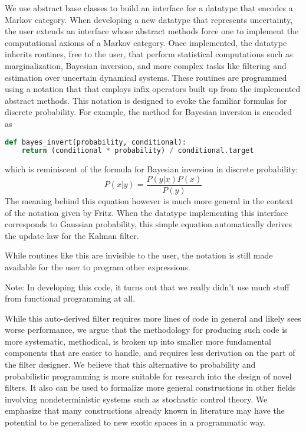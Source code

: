 We use abstract base classes to build an interface for a datatype that encodes a Markov category.
When developing a new datatype that represents uncertainty, the user extends an interface whose abstract methods force one to implement the computational axioms of a Markov category.
Once implemented, the datatype inherits routines, free to the user, that perform statistical computations such as marginalization, Bayesian inversion, and more complex tasks like filtering and estimation over uncertain dynamical systems.
These routines are programmed using a notation that that employs infix operators built up from the implemented abstract methods.
This notation is designed to evoke the familiar formulas for discrete probability.
For example, the method for Bayesian inversion is encoded as

\begin{lstlisting}[language=Python, frame=single]
def bayes_invert(probability, conditional):
    return (conditional * probability) / conditional.target
\end{lstlisting}
which is reminiscent of the formula for Bayesian inversion in discrete probability:
\begin{equation}
    P(x|y) = \frac{P(y|x)P(x)}{P(y)}
\end{equation}
The meaning behind this equation however is much more general in the context of the notation given by Fritz.
When the datatype implementing this interface corresponds to Gaussian probability, this simple equation automatically derives the update law for the Kalman filter.

While routines like this are invisible to the user, the notation is still made available for the user to program other expressions.

Note: In developing this code, it turns out that we really didn't use much stuff from functional programming at all.

While this auto-derived filter requires more lines of code in general and likely sees worse performance, we argue that the methodology for producing such code is more systematic, methodical, is broken up into smaller more fundamental components that are easier to handle, and requires less derivation on the part of the filter designer.
We believe that this alternative to probability and probabilistic programming is more suitable for research into the design of novel filters.
It also can be used to formalize more general constructions in other fields involving nondeterministic systems such as stochastic control theory.
We emphasize that many constructions already known in literature may have the potential to be generalized to new exotic spaces in a programmatic way.
